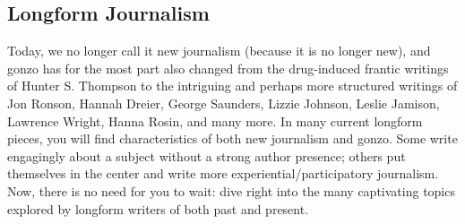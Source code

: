 \documentclass[10pt,a4paper]{article}
\begin{document}
\subsection{Longform Journalism}

Today, we no longer call it new journalism (because it is no longer new), and gonzo has for the most part also changed from the drug-induced frantic writings of Hunter S. Thompson to the intriguing and perhaps more structured writings of Jon Ronson, Hannah Dreier, George Saunders, Lizzie Johnson, Leslie Jamison, Lawrence Wright, Hanna Rosin, and many more. In many current longform pieces, you will find characteristics of both new journalism and gonzo. Some write engagingly about a subject without a strong author presence; others put themselves in the center and write more experiential/participatory journalism. Now, there is no need for you to wait: dive right into the many captivating topics explored by longform writers of both past and present.
\end{document}
